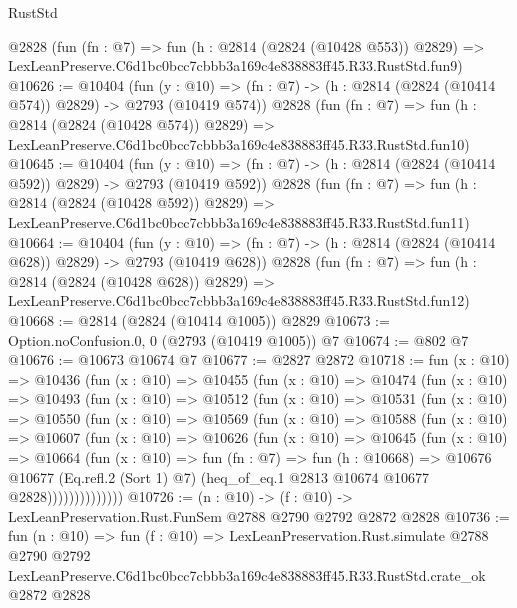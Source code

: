 \begin{lexlean}{RustStd}
\begin{coremodule}
    @2828
    (fun (fn : @7) =>
    fun (h : @2814 (@2824 (@10428 @553)) @2829) =>
    LexLeanPreserve.C6d1bc0bcc7cbbb3a169c4e838883ff45.R33.RustStd.fun9)
@10626 := @10404
    (fun (y : @10) => (fn : @7) -> (h : @2814 (@2824 (@10414 @574)) @2829) -> @2793 (@10419 @574))
    @2828
    (fun (fn : @7) =>
    fun (h : @2814 (@2824 (@10428 @574)) @2829) =>
    LexLeanPreserve.C6d1bc0bcc7cbbb3a169c4e838883ff45.R33.RustStd.fun10)
@10645 := @10404
    (fun (y : @10) => (fn : @7) -> (h : @2814 (@2824 (@10414 @592)) @2829) -> @2793 (@10419 @592))
    @2828
    (fun (fn : @7) =>
    fun (h : @2814 (@2824 (@10428 @592)) @2829) =>
    LexLeanPreserve.C6d1bc0bcc7cbbb3a169c4e838883ff45.R33.RustStd.fun11)
@10664 := @10404
    (fun (y : @10) => (fn : @7) -> (h : @2814 (@2824 (@10414 @628)) @2829) -> @2793 (@10419 @628))
    @2828
    (fun (fn : @7) =>
    fun (h : @2814 (@2824 (@10428 @628)) @2829) =>
    LexLeanPreserve.C6d1bc0bcc7cbbb3a169c4e838883ff45.R33.RustStd.fun12)
@10668 := @2814 (@2824 (@10414 @1005)) @2829
@10673 := Option.noConfusion.{0, 0} (@2793 (@10419 @1005)) @7
@10674 := @802 @7
@10676 := @10673 @10674 @7
@10677 := @2827 @2872
@10718 := fun (x : @10) =>
  @10436
    (fun (x : @10) =>
    @10455
      (fun (x : @10) =>
      @10474
        (fun (x : @10) =>
        @10493
          (fun (x : @10) =>
          @10512
            (fun (x : @10) =>
            @10531
              (fun (x : @10) =>
              @10550
                (fun (x : @10) =>
                @10569
                  (fun (x : @10) =>
                  @10588
                    (fun (x : @10) =>
                    @10607
                      (fun (x : @10) =>
                      @10626
                        (fun (x : @10) =>
                        @10645
                          (fun (x : @10) =>
                          @10664
                            (fun (x : @10) =>
                            fun (fn : @7) =>
                            fun (h : @10668) =>
                            @10676
                              @10677
                              (Eq.refl.{2} (Sort 1) @7)
                              (heq_of_eq.{1} @2813 @10674 @10677 @2828))))))))))))))
@10726 := (n : @10) -> (f : @10) -> LexLeanPreservation.Rust.FunSem @2788 @2790 @2792 @2872 @2828
@10736 := fun (n : @10) =>
  fun (f : @10) =>
  LexLeanPreservation.Rust.simulate
    @2788
    @2790
    @2792
    LexLeanPreserve.C6d1bc0bcc7cbbb3a169c4e838883ff45.R33.RustStd.crate_ok
    @2872
    @2828
\end{coremodule}
\end{lexlean}
